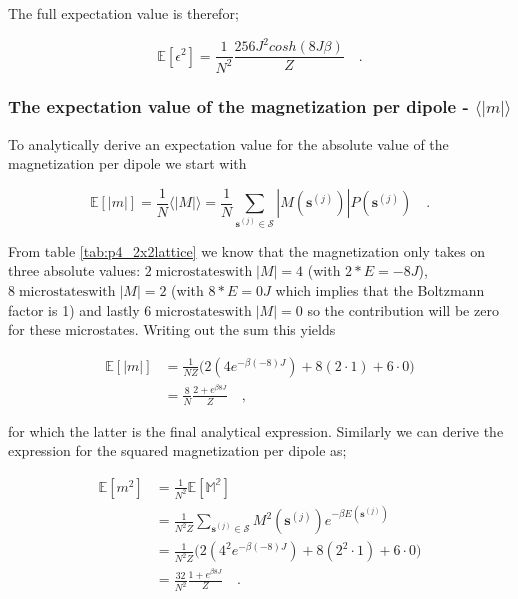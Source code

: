 \documentclass[../main_proj4_correct_template.tex]{subfiles}
\begin{document}
\noindent The full expectation value is therefor;

\begin{equation*}
    \mathbb{E}[\epsilon^{2}] = \frac{1}{N^{2}}\frac{256 J^{2} cosh(8J\beta)}{Z} \quad.
\end{equation*}



\subsubsection{The expectation value of the magnetization per dipole - $\langle |m|\rangle$}

To analytically derive an expectation value for the absolute value of the magnetization per dipole we start with 

\begin{equation*}
    \mathbb{E}[|m|] = \frac{1}{N} \langle|M|\rangle = \frac{1}{N} \sum\limits_{\mathbf{s}^{(j)} \in \mathcal{S}} |M(\mathbf{s}^{(j)})| P(\mathbf{s}^{(j)}) \quad.
\end{equation*}

\noindent From table \ref{tab:p4_2x2lattice} we know that the magnetization only takes on three absolute values: $2\operatorname{microstates with }|M|=4$ (with $2*E=-8J$), $8\operatorname{microstates with }|M|=2$ (with $8*E=0J$ which implies that the Boltzmann factor is 1) and lastly $6\operatorname{microstates with }|M|=0$ so the contribution will be zero for these microstates. Writing out the sum this yields

\begin{equation*}
\begin{split}
    \mathbb{E}[|m|] &= \frac{1}{NZ}\bigg( 2(4 e^{-\beta(-8)J}) +8(2\cdot1) + 6\cdot 0\bigg) \\
    &= \frac{8}{N} \frac{2+e^{\beta 8 J}}{Z} \quad,
\end{split}   
\end{equation*}

\noindent for which the latter is the final analytical expression. Similarly we can derive the expression for the squared magnetization per dipole as; 

\begin{equation*}
\begin{split}
    \mathbb{E}[m^{2}] & = \frac{1}{N^{2}} \mathbb{E[M^{2}]} \\
    &= \frac{1}{N^{2}Z} \sum\limits_{\mathbf{s}^{(j)} \in \mathcal{S}} M^{2}(\mathbf{s}^{(j)})e^{-\beta E(\mathbf{s}^{(j)})} \\
    &= \frac{1}{N^{2}Z} \bigg( 2(4^{2} e^{-\beta(-8)J}) +8(2^{2}\cdot1) + 6\cdot 0\bigg) \\
    &= \frac{32}{N^{2}} \frac{1+ e^{\beta 8J}}{Z} \quad.
\end{split}
\end{equation*}
\end{document}
